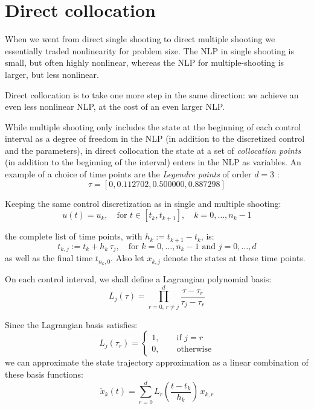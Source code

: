 \documentclass[a4paper,12pt]{book}
\begin{document}
{\section{Direct collocation}
When we went from direct single shooting to direct multiple shooting we essentially traded nonlinearity for problem size. The NLP in single shooting is small, but often highly nonlinear, whereas the NLP for multiple-shooting is larger, but less nonlinear.

Direct collocation is to take one more step in the same direction: we achieve an even less nonlinear NLP, at the cost of an even larger NLP.

While multiple shooting only includes the state at the beginning of each control interval as a degree of freedom in the NLP (in addition to the discretized control and the parameters), in direct collocation the state at a set of \emph{collocation points} (in addition to the beginning of the interval) enters in the NLP as variables. An example of a choice of time points are the \emph{Legendre points} of order $d=3$ :
\begin{equation}
 \tau = [0,0.112702,0.500000,0.887298]
\end{equation}

Keeping the same control discretization as in single and multiple shooting:
\begin{equation}
 u(t) = u_k, \quad \text{for $t \in [t_k, t_{k+1}], \quad k=0,\ldots,n_k-1$}
\end{equation}

the complete list of time points, with $h_k := t_{k+1}-t_k$, is:
\begin{equation}
 t_{k,j} := t_k + h_k \, \tau_j, \quad \text{for $k=0,\ldots,n_k-1$ and $j=0,\ldots,d$}
\end{equation}
as well as the final time $t_{n_k,0}$. Also let $x_{k,j}$ denote the states at these time points.

On each control interval, we shall define a Lagrangian polynomial basis:
\begin{equation}
 L_j(\tau) = \prod_{r=0, \, r \ne j}^{d} \frac{\tau - \tau_{r}}{\tau_j - \tau_r}
\end{equation}

Since the Lagrangian basis satisfies:
\begin{equation}
 L_j(\tau_r) = \left\{
 \begin{array}{l}
  1, \qquad \text{if $j=r$} \\
  0, \qquad \text{otherwise}
 \end{array}
  \right.
\end{equation}
we can approximate the state trajectory approximation as a linear combination of these basis functions:
\begin{equation}
\tilde{x}_k(t) = \sum_{r=0}^{d}{L_r\left(\frac{t-t_k}{h_k}\right) \, x_{k,r}}
\end{equation}

}
\end{document}
